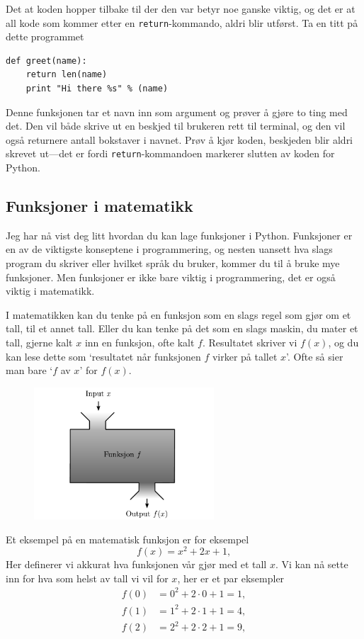\documentclass[a4paper, 11pt, notitlepage]{article}
\begin{document}
Det at koden hopper tilbake til der den var betyr noe ganske viktig, og det er at all kode som kommer etter en \verb+return+-kommando, aldri blir utførst. Ta en titt på dette programmet
\begin{lstlisting}
def greet(name):
	return len(name)
	print "Hi there %s" % (name)
\end{lstlisting}
Denne funksjonen tar et navn inn som argument og prøver å gjøre to ting med det. Den vil både skrive ut en beskjed til brukeren rett til terminal, og den vil også returnere antall bokstaver i navnet. Prøv å kjør koden, beskjeden blir aldri skrevet ut---det er fordi \verb+return+-kommandoen markerer slutten av koden for Python.


\subsection*{Funksjoner i matematikk}

Jeg har nå vist deg litt hvordan du kan lage funksjoner i Python. Funksjoner er en av de viktigste konseptene i programmering, og nesten uansett hva slags program du skriver eller hvilket språk du bruker, kommer du til å bruke mye funksjoner. Men funksjoner er ikke bare viktig i programmering, det er også viktig i matematikk.

I matematikken kan du tenke på en funksjon som en slags regel som gjør om et tall, til et annet tall. Eller du kan tenke på det som en slags maskin, du mater et tall, gjerne kalt $x$ inn en funksjon, ofte kalt $f$. Resultatet skriver vi $f(x)$, og du kan lese dette som `resultatet når funksjonen $f$ virker på tallet $x$'. Ofte så sier man bare `$f$ av $x$' for $f(x)$.

\begin{figure}[h]
\centering
	\includegraphics[width=0.6\textwidth]{fig/function_blackbox}
\end{figure}

Et eksempel på en matematisk funksjon er for eksempel
$$f(x) = x^2 + 2x + 1,$$
Her definerer vi akkurat hva funksjonen vår gjør med et tall $x$. Vi kan nå sette inn for hva som helst av tall vi vil for $x$, her er et par eksempler
\begin{align*}
f(0) &= 0^2 + 2\cdot 0 + 1 = 1, \\
f(1) &= 1^2 + 2\cdot 1 + 1 = 4, \\
f(2) &= 2^2 + 2\cdot 2 + 1 = 9, \\
\end{align*}
\end{document}
